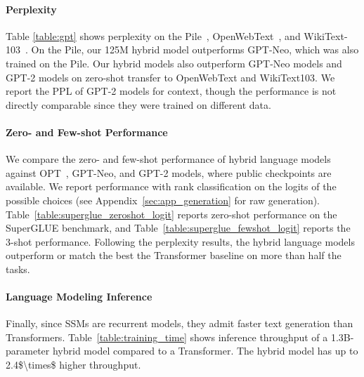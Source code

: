 \paragraph{Perplexity}
Table \ref{table:gpt} shows perplexity on the Pile~\citep{gao2020pile}, OpenWebText~\citep{Gokaslan2019OpenWeb}, and WikiText-103~\citep{merity2016pointer}. 
On the Pile, our 125M hybrid model outperforms GPT-Neo, which was also trained on the Pile.
Our hybrid models also outperform GPT-Neo models and GPT-2 models on zero-shot transfer to OpenWebText and WikiText103.
We report the PPL of GPT-2 models for context, though the performance is not directly comparable since they were trained on different data.

\paragraph{Zero- and Few-shot Performance}
We compare the zero- and few-shot performance of hybrid \hthree language models against OPT~\citep{zhang2022opt}, GPT-Neo, and GPT-2 models, where public checkpoints are available.
We report performance with rank classification on the logits of the possible choices (see Appendix~\ref{sec:app_generation} for raw generation).
Table~\ref{table:superglue_zeroshot_logit} reports zero-shot performance on the SuperGLUE benchmark, and Table~\ref{table:superglue_fewshot_logit} reports the 3-shot performance.
Following the perplexity results, the hybrid language models outperform or match the best the Transformer baseline on more than half the tasks.

\begin{table}[t]
\centering

\end{table}
\paragraph{Language Modeling Inference}
Finally, since SSMs are recurrent models, they admit faster text generation than Transformers.
Table~\ref{table:training_time} shows inference throughput of a 1.3B-parameter hybrid model compared to a Transformer.
The hybrid model has up to \num{2.4$\times$} higher throughput.



